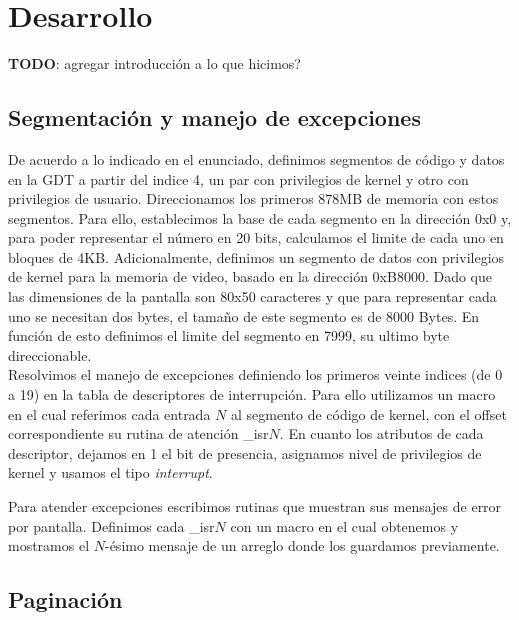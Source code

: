 \section{Desarrollo}

\textbf{TODO}: agregar introducción a lo que hicimos?

\subsection{Segmentación y manejo de excepciones}

De acuerdo a lo indicado en el enunciado, definimos segmentos de código y datos en la GDT a partir del indice 4, un par con privilegios de kernel y otro con privilegios de usuario. 
Direccionamos los primeros $878$MB de memoria con estos segmentos.
Para ello, establecimos la base de cada segmento en la dirección 0x0 y, para poder representar el número en 20 bits, calculamos el limite de cada uno en bloques de 4KB. 
Adicionalmente, definimos un segmento de datos con privilegios de kernel para la memoria de video, basado en la dirección 0xB8000. Dado que las dimensiones de la pantalla son 80x50 caracteres y que para representar cada uno se necesitan dos bytes, el tamaño de este segmento es de 8000 Bytes. En función de esto definimos el limite del segmento en 7999, su ultimo byte direccionable.\\

Resolvimos el manejo de excepciones definiendo los primeros veinte indices (de 0 a 19) en la tabla de descriptores de interrupción. 
Para ello utilizamos un macro en el cual referimos cada entrada $N$ al segmento de código de kernel, con el offset correspondiente su rutina de atención \_isr$N$. 
En cuanto los atributos de cada descriptor, dejamos en 1 el bit de presencia, asignamos nivel de privilegios de kernel y usamos el tipo \textit{interrupt}.

Para atender excepciones escribimos rutinas que muestran sus mensajes de error por pantalla.
Definimos cada \_isr$N$ con un macro en el cual obtenemos y mostramos el $N$-ésimo mensaje de un arreglo donde los guardamos previamente.\\


\subsection{Paginación}

